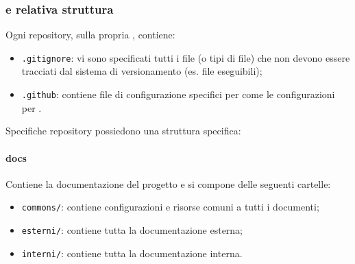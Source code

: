     \subsubsection{ e relativa struttura}
    Ogni repository, sulla propria , contiene:
    \begin{itemize}
        \item \verb!.gitignore!: vi sono specificati tutti i file (o tipi di file) che non devono essere tracciati dal sistema di versionamento (es. file eseguibili);
        \item \verb!.github!: contiene file di configurazione specifici per  come le configurazioni per .
    \end{itemize}
    Specifiche repository possiedono una struttura specifica:
        \paragraph{docs}
        Contiene la documentazione del progetto e si compone delle seguenti cartelle:
        \begin{itemize}
            \item \verb!commons/!: contiene configurazioni e risorse comuni a tutti i documenti;
            \item \verb!esterni/!: contiene tutta la documentazione esterna;
            \item \verb!interni/!: contiene tutta la documentazione interna.
        \end{itemize}